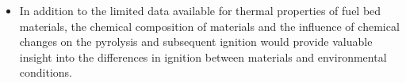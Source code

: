 \begin{itemize}
            \item In addition to the limited data available for thermal properties of fuel bed materials, the chemical composition of materials and the influence of chemical changes on the pyrolysis and subsequent ignition would provide valuable insight into the differences in ignition between materials and environmental conditions. 
        
        \end{itemize}